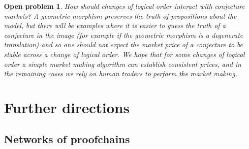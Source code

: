 \documentclass[english,letter paper,12pt,reqno]{article}
\theoremstyle{example}
\newtheorem{problem}[theorem]{Open problem}
\begin{document}


\begin{problem} How should changes of logical order interact with conjecture markets? A geometric morphism preserves the truth of propositions about the model, but there will be examples where it is \emph{easier} to guess the truth of a conjecture in the image (for example if the geometric morphism is a degenerate translation) and so one should not expect the market price of a conjecture to be stable across a change of logical order. We hope that for some changes of logical order a simple market making algorithm can establish consistent prices, and in the remaining cases we rely on human traders to perform the market making.
\end{problem}


\section{Further directions}

\subsection{Networks of proofchains}\label{section:reuse}
\end{document}
